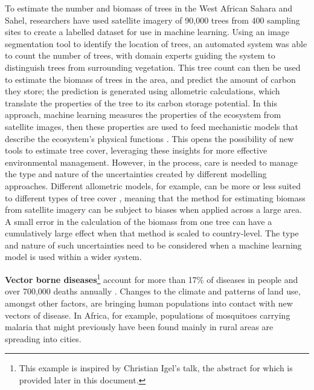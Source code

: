 To estimate the number and biomass of trees in the West African Sahara
and Sahel, researchers have used satellite imagery of 90,000 trees from
400 sampling sites to create a labelled dataset for use in machine
learning. Using an image segmentation tool to identify the location of
trees, an automated system was able to count the number of trees, with
domain experts guiding the system to distinguish trees from surrounding
vegetation. This tree count can then be used to estimate the biomass of
trees in the area, and predict the amount of carbon they store; the
prediction is generated using allometric calculations, which translate
the properties of the tree to its carbon storage potential. In this
approach, machine learning measures the properties of the ecosystem from
satellite images, then these properties are used to feed mechanistic
models that describe the ecosystem's physical functions \citep{Brandt-trees20}. This opens the
possibility of new tools to estimate tree cover, leveraging these
insights for more effective environmental management. However, in the
process, care is needed to manage the type and nature of the
uncertainties created by different modelling approaches. Different
allometric models, for example, can be more or less suited to different
types of tree cover \citep{Hiernaux-allometric23},
meaning that the method for estimating biomass from satellite imagery
can be subject to biases when applied across a large area. A small error
in the calculation of the biomass from one tree can have a cumulatively
large effect when that method is scaled to country-level. The type and
nature of such uncertainties need to be considered when a machine
learning model is used within a wider system.

\textbf{Vector borne diseases}\footnote{This example is inspired by
  Christian Igel's talk, the abstract for which is provided later in
  this document.} account for more than 17\% of diseases in people and
over 700,000 deaths annually \citep{Hernandez-taking22}.
Changes to the climate and patterns of land use, amongst other factors,
are bringing human populations into contact with new vectors of disease.
In Africa, for example, populations of mosquitoes carrying malaria that
might previously have been found mainly in rural areas are spreading
into cities.

